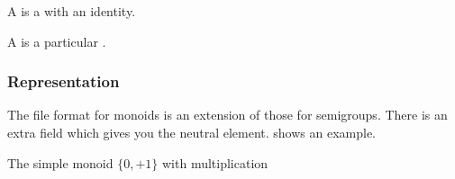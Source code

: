 
A \Monoid is a \Semigroup with an identity.


A \FiniteMonoid is a particular \FiniteSemigroup.


\subsubsection*{Representation}

The file format for monoids is an extension of those for semigroups.
There is an extra field  which gives you the neutral element.
 shows an example.

\begin{marginfigure}%
    \caption{The simple monoid $\{0,+1\}$ with multiplication}%
    \label{fig:monoid2}%
\end{marginfigure}%



